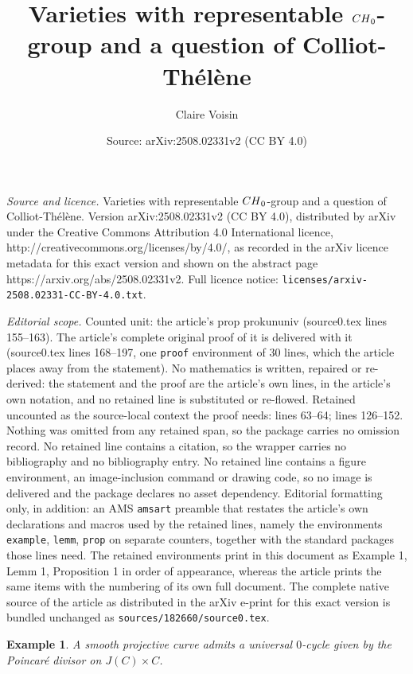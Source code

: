 \documentclass[10pt,a4paper]{amsart}
\title{Varieties with representable ${\rm CH}_0$-group and a question of Colliot-Th\'{e}l\`{e}ne}
\author{Claire Voisin}
\date{Source: arXiv:2508.02331v2 (CC BY 4.0)}
\newtheorem{example}{Example}
\begin{document}
\maketitle

\noindent\emph{Source and licence.} Varieties with representable ${\rm CH}_0$-group and a question of Colliot-Th\'{e}l\`{e}ne. Version arXiv:2508.02331v2 (CC BY 4.0), distributed by arXiv under the Creative Commons Attribution 4.0 International licence, http://creativecommons.org/licenses/by/4.0/, as recorded in the arXiv licence metadata for this exact version and shown on the abstract page https://arxiv.org/abs/2508.02331v2. Full licence notice: \texttt{licenses/arxiv-2508.02331-CC-BY-4.0.txt}.\par\smallskip

\noindent\textit{Editorial scope.} Counted unit: the article's prop prokununiv (source0.tex lines 155--163). The article's complete original proof of it is delivered with it (source0.tex lines 168--197, one \texttt{proof} environment of 30 lines, which the article places away from the statement). No mathematics is written, repaired or re-derived: the statement and the proof are the article's own lines, in the article's own notation, and no retained line is substituted or re-flowed.  Retained uncounted as the source-local context the proof needs: lines 63--64; lines 126--152.  Nothing was omitted from any retained span, so the package carries no omission record.  No retained line contains a citation, so the wrapper carries no bibliography and no bibliography entry.  No retained line contains a figure environment, an image-inclusion command or drawing code, so no image is delivered and the package declares no asset dependency.  Editorial formatting only, in addition: an AMS \texttt{amsart} preamble that restates the article's own declarations and macros used by the retained lines, namely the environments \texttt{example}, \texttt{lemm}, \texttt{prop} on separate counters, together with the standard packages those lines need.  The retained environments print in this document as Example 1, Lemm 1, Proposition 1 in order of appearance, whereas the article prints the same items with the numbering of its own full document.  The complete native source of the article as distributed in the arXiv e-print for this exact version is bundled unchanged as \texttt{sources/182660/source0.tex}.
\begin{example}\label{example}{\rm A smooth projective curve admits a universal $0$-cycle given by the Poincar\'{e} divisor on $J(C)\times C $.}
\end{example}
\end{document}
